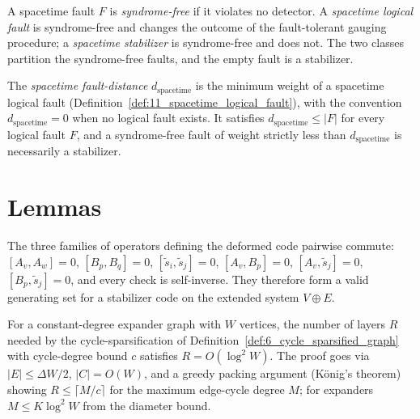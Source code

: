 \begin{definition}
\label{def:11_spacetime_logical_fault}
\leanok
A spacetime fault $F$ is \emph{syndrome-free} if it violates no detector. A
\emph{spacetime logical fault} is syndrome-free and changes the outcome of the
fault-tolerant gauging procedure; a \emph{spacetime stabilizer} is syndrome-free and does
not. The two classes partition the syndrome-free faults, and the empty fault is a stabilizer.
\end{definition}

\begin{definition}
\label{def:12_spacetime_fault_distance}
\leanok
The \emph{spacetime fault-distance} $d_{\mathrm{spacetime}}$ is the minimum weight of a
spacetime logical fault (Definition~\ref{def:11_spacetime_logical_fault}), with the
convention $d_{\mathrm{spacetime}} = 0$ when no logical fault exists. It satisfies
$d_{\mathrm{spacetime}} \le |F|$ for every logical fault $F$, and a syndrome-free fault of
weight strictly less than $d_{\mathrm{spacetime}}$ is necessarily a stabilizer.
\end{definition}

\chapter{Lemmas}

\begin{lemma}
\label{lem:1_deformed_code_checks}
\leanok
The three families of operators defining the deformed code pairwise commute: $[A_v, A_w] = 0$,
$[B_p, B_q] = 0$, $[\tilde s_i, \tilde s_j] = 0$, $[A_v, B_p] = 0$, $[A_v, \tilde s_j] = 0$,
$[B_p, \tilde s_j] = 0$, and every check is self-inverse. They therefore form a valid
generating set for a stabilizer code on the extended system $V \oplus E$.
\end{lemma}

\begin{lemma}
\label{lem:2_decongestion_bound}
\leanok
For a constant-degree expander graph with $W$ vertices, the number of layers $R$ needed by
the cycle-sparsification of Definition~\ref{def:6_cycle_sparsified_graph} with cycle-degree
bound $c$ satisfies $R = O(\log^2 W)$. The proof goes via $|E| \le \Delta W / 2$,
$|C| = O(W)$, and a greedy packing argument (König's theorem) showing
$R \le \lceil M/c \rceil$ for the maximum edge-cycle degree $M$; for expanders
$M \le K \log^2 W$ from the diameter bound.
\end{lemma}

